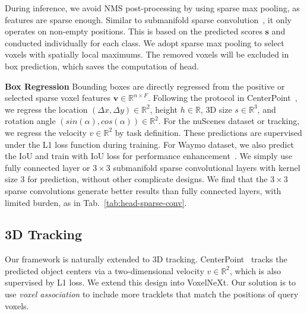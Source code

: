 \documentclass[10pt,twocolumn,letterpaper]{article}
\begin{document}
\begin{table}[t]
\begin{center}
\caption{Effects of spatial pruning on various layers. We use it on the first 3 down-sampling layers by default.}
\label{tab:voxel-pruning-layers}
\end{center}
\end{table}

During inference, we avoid NMS post-processing by using sparse max pooling, as features are sparse enough. Similar to submanifold sparse convolution~\cite{submanifold-sparse-conv-v2}, it only operates on non-empty positions. This is based on the predicted scores $\mathbf{s}$ and conducted individually for each class. We adopt sparse max pooling to select voxels with spatially local maximums.  The removed voxels will be excluded in box prediction, which saves the computation of head.

\vspace{0.5em}
\noindent
\textbf{Box Regression}
Bounding boxes are directly regressed from the positive or selected sparse voxel features $\mathbf{v}\in \mathbb{R}^{n\times F}$. Following the protocol in CenterPoint~\cite{centerpoint}, we regress the location $(\Delta x, \Delta y)\in \mathbb{R}^2$, height $h\in \mathbb{R}$, 3D size $s \in \mathbb{R}^3$, and rotation angle $(sin(\alpha), cos(\alpha)) \in \mathbb{R}^2$. For the nuScenes dataset or tracking, we regress the velocity $v \in \mathbb{R}^2$ by task definition. These predictions are supervised under the L1 loss function during training. For Waymo dataset, we also predict the IoU and train with IoU loss for performance enhancement~\cite{afdetv2}. We simply use fully connected layer or $3\times 3$ submanifold sparse convolutional layers with kernel size 3 for prediction, without other complicate designs. We find that the $3\times 3$ sparse convolutions generate better results than fully connected layers, with limited burden, as in Tab.~\ref{tab:head-sparse-conv}.

\subsection{3D Tracking}
\label{sec:3d-tracking}
Our framework is naturally extended to 3D tracking. CenterPoint~\cite{centerpoint} tracks the predicted object centers via a two-dimensional velocity $v \in \mathbb{R}^2$, which is also supervised by L1 loss. We extend this design into VoxelNeXt. Our solution is to use {\em voxel association} to include more tracklets that match the positions of query voxels.
\end{document}
